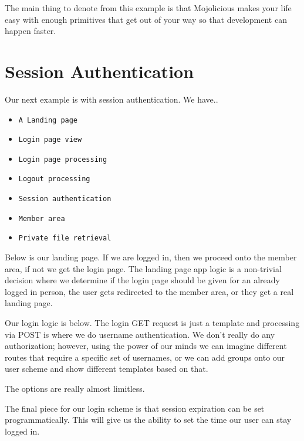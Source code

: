 \documentclass[14pt]{extreport}
\begin{document}
The main thing to denote from this example is that Mojolicious makes your life
easy with enough primitives that get out of your way so that development can happen 
faster.

\section{Session Authentication}

Our next example is with session authentication.  We have..

\begin{itemize} \itemsep1pt \parskip0pt 
\item \verb|A Landing page|
\item \verb|Login page view|
\item \verb|Login page processing|
\item \verb|Logout processing|
\item \verb|Session authentication|
\item \verb|Member area|
\item \verb|Private file retrieval|
\end{itemize}

Below is our landing page.  If we are logged in, then we proceed onto the
member area, if not we get the login page.  The landing page app logic is a
non-trivial decision where we determine if the login page should be given for
an already logged in person, the user gets redirected to the member area, or
they get a real landing page.



Our login logic is below.  The login GET request is just a template and
processing via POST is where we do username authentication.  We don't really do
any authorization; however, using the power of our minds we can imagine
different routes that require a specific set of usernames, or we can add groups
onto our user scheme and show different templates based on that.

\clearpage

The options are really almost limitless.



The final piece for our login scheme is that session expiration can be set
programmatically.  This will give us the ability to set the time our user can
stay logged in.
\end{document}
